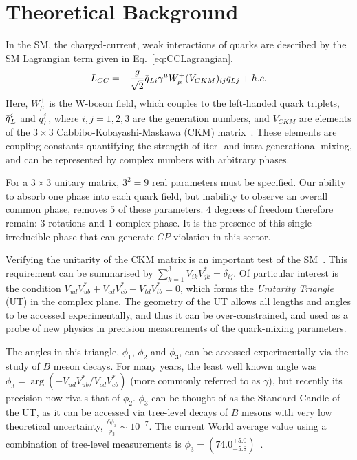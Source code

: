 \documentclass[oneside,12pt]{article}
\newcommand{\overbar}[1]{\mkern 1.5mu\overline{\mkern-1.5mu#1\mkern-1.5mu}\mkern
1.5mu}
\begin{document}
\section{\normalsize Theoretical Background} \label{sec:theory}
In the SM, the charged-current, weak interactions of quarks are described by the
SM Lagrangian term given in Eq.~\eqref{eq:CCLagrangian}.
\begin{equation}
  L_{CC}=-\frac{g}{\sqrt{2}}\overbar{q}_{Li}\gamma^{\mu}W_{\mu}^{+}(V_{CKM})_{ij}q_{Lj}
  + h.c.  
  \label{eq:CCLagrangian}
\end{equation}
\noindent Here, $W_{\mu}^{+}$ is the W-boson field, which couples to the
left-handed quark triplets, $\overbar{q}_{L}^{i}$ and $q_{L}^{j}$, where
$i,j=1,2,3$ are the generation numbers, and $V_{CKM}$ are elements of the
$3\times 3$ Cabbibo-Kobayashi-Maskawa (CKM) matrix~\cite{CKMTheory}. These
elements are coupling constants quantifying the strength of iter- and
intra-generational mixing, and can be represented by complex numbers with arbitrary phases.

For a $3\times 3$ unitary matrix, $3^2=9$ real parameters must be specified. Our
ability to absorb one phase into each quark field, but inability to observe an
overall common phase, removes $5$ of these parameters. $4$ degrees of freedom
therefore remain: $3$ rotations and $1$ complex phase. It is the presence of
this single irreducible phase that can generate $CP$ violation in this sector.

Verifying the unitarity of the CKM matrix is an important test of the
SM~\cite{CKMTheory}. This requirement can be summarised by
$\sum_{k=1}^{3}V_{ik}V^*_{jk}=\delta_{ij}$. Of particular interest is the
condition $V_{ud}V^{*}_{ub}+V_{cd}V^{*}_{cb}+V_{td}V^{*}_{tb}=0$, which forms
the \emph{Unitarity Triangle} (UT) in the complex plane. The geometry of the UT
allows all lengths and angles to be accessed experimentally, and thus it can be
over-constrained, and used as a probe of new physics in precision measurements
of the quark-mixing parameters. 

The angles in this triangle, $\phi_1$, $\phi_2$ and $\phi_3$, can be accessed
experimentally via the study of $B$ meson decays. For many years, the least well
known angle was $\phi_3=\arg(-V_{ud}V^{*}_{ub}/V_{cd}V^{*}_{cb})$ (more commonly
referred to as $\gamma$), but recently its precision now rivals that of
$\phi_2$. $\phi_3$ can be thought of as the Standard Candle of the UT, as it can
be accessed via tree-level decays of $B$ mesons with very low theoretical
uncertainty, $\frac{\delta\phi_3}{\phi_3}\sim 10^{-7}$. The current World
average value using a combination of tree-level measurements is
$\phi_3=(74.0^{+5.0}_{-5.8})$\degree~\cite{LatestGamma}.
\end{document}
